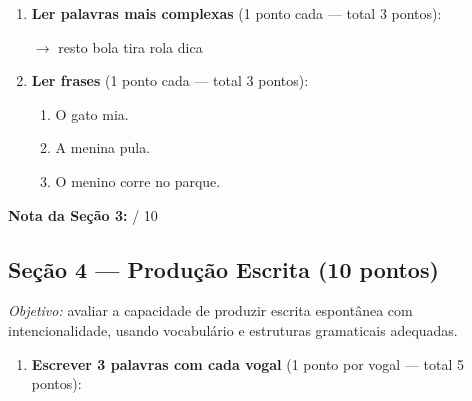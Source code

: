 \begin{avaliacao}
\begin{enumerate}[resume]
  \item \textbf{Ler palavras mais complexas} (1 ponto cada — total 3 pontos):

  \begin{center}
  $\rightarrow$ resto \quad bola \quad tira \quad rola \quad dica
  \end{center}

  \item \textbf{Ler frases} (1 ponto cada — total 3 pontos):

  \begin{enumerate}[label=\arabic*., leftmargin=1.5cm]
    \item O gato mia.
    \item A menina pula.
    \item O menino corre no parque.
  \end{enumerate}
\end{enumerate}

\medskip
\noindent\textbf{Nota da Seção 3:} \underline{\hspace{1cm}} / 10

\subsection*{Seção 4 — Produção Escrita (10 pontos)}

\textit{Objetivo:} avaliar a capacidade de produzir escrita espontânea
com intencionalidade, usando vocabulário e estruturas gramaticais adequadas.

\begin{enumerate}[resume]
  \item \textbf{Escrever 3 palavras com cada vogal} (1 ponto por vogal — total 5 pontos):


\end{enumerate}
\end{avaliacao}
